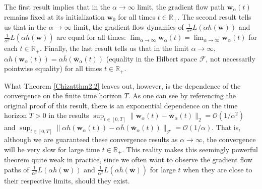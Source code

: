 \documentclass{article}
\begin{document}
The first result implies that in the $\alpha \rightarrow \infty$ limit, the gradient flow path $\boldsymbol{w}_{\alpha}(t)$ remains fixed at its initialization $\boldsymbol{w}_0$ for all times $t \in \mathbb{R}_+$. The second result tells us that in the $\alpha \rightarrow \infty$ limit, the gradient flow dynamics of $\frac{1}{\alpha^2} L(\alpha h(\boldsymbol{w}))$ and $\frac{1}{\alpha^2} L(\alpha \bar{h}(\boldsymbol{w}))$ are equal for all times: $\lim_{\alpha \to \infty} \boldsymbol{w}_{\alpha}(t) = \lim_{\alpha \to \infty} \boldsymbol{\bar{w}}_{\alpha}(t)$ for each $t \in \mathbb{R}_+$. Finally, the last result tells us that in the limit $\alpha \rightarrow \infty$, $\alpha h(\boldsymbol{w}_{\alpha}(t)) = \alpha \bar{h}(\boldsymbol{\bar{w}}_{\alpha}(t))$ (equality in the Hilbert space $\mathcal{F}$, not necessarily pointwise equality) for all times $t \in \mathbb{R}_+$.

What Theorem \ref{Chizatthm2.2} leaves out, however, is the dependence of the convergence on the finite time horizon $T$. As one can see by referencing the original proof of this result, there is an exponential dependence on the time horizon $T>0$ in the results $\sup_{t \in [0, T]} \| \boldsymbol{w}_{\alpha}(t) - \boldsymbol{\bar{w}}_{\alpha}(t) \|_2 = \mathcal{O}(1/\alpha^2)$ and $\sup_{t \in [0, T]} \| \alpha h(\boldsymbol{w}_{\alpha}(t)) - \alpha \bar{h}(\boldsymbol{\bar{w}}_{\alpha}(t)) \|_{\mathcal{F}} = \mathcal{O}(1/\alpha)$. That is, although we are guaranteed these convergence results as $\alpha \rightarrow \infty$, the convergence will be very slow for large time $t \in \mathbb{R}_+$. This reality makes this seemingly powerful theorem quite weak in practice, since we often want to observe the gradient flow paths of $\frac{1}{\alpha^2}L(\alpha h(\boldsymbol{w}))$ and $\frac{1}{\alpha^2}L(\alpha \bar{h}(\boldsymbol{\bar{w}}))$ for large $t$ when they are close to their respective limits, should they exist.
\end{document}
